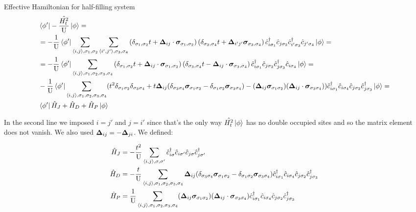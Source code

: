 \begin{section}{Effective Hamiltonian for half-filling system}
\begin{align}
\label{PertNoEMF}
&\bra{\phi'} -\frac{\hat{H_t^2}}{\text{U}} \ket{\phi} = \nonumber \\
&= -\frac{1}{\text{U}} \bra{\phi'}\sum_{\langle i,j \rangle, \sigma_1, \sigma_2} \sum_{\langle i',j' \rangle, 					\sigma_3, \sigma_4} \left( \delta_{\sigma_1, \sigma_2} t + \boldsymbol{\Delta}_{ij} \cdot\boldsymbol{\sigma}_{\sigma_1, \sigma_2} \right) \left( \delta_{\sigma_3, \sigma_4} t + \boldsymbol{\Delta}_{i'j'} \boldsymbol{\sigma}_{\sigma_3, \sigma_4} \right)\hat{c}_{i\sigma_1}^\dagger \hat{c}_{j \sigma_2} \hat{c}_{i' \sigma_3}^\dagger \hat{c}_{j'\sigma_4} \ket{\phi} = \nonumber \\
&= -\frac{1}{\text{U}} \bra{\phi'}\sum_{\langle i,j \rangle, \sigma_1, \sigma_2, \sigma_3, \sigma_4} \left( \delta_{\sigma_1, \sigma_2} t + \boldsymbol{\Delta}_{ij} \cdot\boldsymbol{\sigma}_{\sigma_1, \sigma_2} \right) \left( \delta_{\sigma_3, \sigma_4} t - \boldsymbol{\Delta}_{ij} \cdot\boldsymbol{\sigma}_{\sigma_3, \sigma_4} \right)\hat{c}_{i\sigma_1}^\dagger \hat{c}_{j \sigma_2} \hat{c}_{j \sigma_3}^\dagger \hat{c}_{i\sigma_4} \ket{\phi} = \nonumber \\
&-\frac{1}{\text{U}} \bra{\phi'} \sum_{\langle i,j \rangle, \sigma_1, \sigma_2, \sigma_3, \sigma_4} (t^2 						\delta_{\sigma_1 \sigma_2}\delta_{\sigma_3 \sigma_4} + t\boldsymbol{\Delta}_{ij}(\delta_{\sigma_3 \sigma_4}			\boldsymbol{\sigma}_{\sigma_1 \sigma_2} - \delta_{\sigma_1 \sigma_2} \boldsymbol{\sigma}_{\sigma_3 \sigma_4}) - (\boldsymbol{\Delta}_{ij}\boldsymbol{\sigma}_{\sigma_1 \sigma_2})(\boldsymbol{\Delta}_{ij} \cdot\boldsymbol{\sigma}_{\sigma_3 \sigma_4}) ) \hat{c}_{i\sigma_1}^\dagger \hat{c}_{i\sigma_4} \hat{c}_{j 		\sigma_2} \hat{c}_{j \sigma_3}^\dagger \ket{\phi} = \nonumber \\
& \bra{\phi'} \hat{H}_J + \hat{H}_D + \hat{H}_P \ket{\phi}
\end{align}

In the second line we imposed $i=j'$ and $j=i'$ since that's the only way $\hat{H_t^2}\ket{\phi}$ has no double occupied sites and so the matrix element does not vanish. We also used $\boldsymbol{\Delta}_{ij} = - \boldsymbol{\Delta}_{ji}$. We defined:

\begin{align}
\hat{H}_J &= -\frac{t^2}{\text{U}} \sum_{\langle i,j \rangle, \sigma, \sigma'} \hat{c}_{i\sigma}^\dagger \hat{c}_{i\sigma'} \hat{c}_{j\sigma} \hat{c}_{j \sigma'}^\dagger \\
\hat{H}_D &= -\frac{t}{\text{U}}\sum_{\langle i,j \rangle, \sigma_1, \sigma_2, \sigma_3, \sigma_4} \boldsymbol{\Delta}_{ij}(\delta_{\sigma_3 \sigma_4}	\boldsymbol{\sigma}_{\sigma_1 \sigma_2} - \delta_{\sigma_1 \sigma_2} \boldsymbol{\sigma}_{\sigma_3 	\sigma_4}) \hat{c}_{i\sigma_1}^\dagger \hat{c}_{i\sigma_4} \hat{c}_{j \sigma_2} \hat{c}_{j \sigma_3}^\dagger \\
\hat{H}_P &= \frac{1}{\text{U}}\sum_{\langle i,j \rangle, \sigma_1, \sigma_2, \sigma_3, \sigma_4} (\boldsymbol{\Delta}_{ij}\boldsymbol{\sigma}_{\sigma_1 \sigma_2})(\boldsymbol{\Delta}_{ij} \cdot\boldsymbol{\sigma}_{\sigma_3 \sigma_4}) \hat{c}_{i\sigma_1}^\dagger \hat{c}_{i\sigma_4} \hat{c}_{j \sigma_2} \hat{c}_{j \sigma_3}^\dagger
\end{align}


\end{section}
